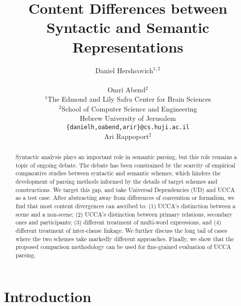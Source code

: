 \documentclass[11pt,a4paper]{article}
\title{Content Differences between Syntactic and Semantic Representations}
\author{Daniel Hershcovich$^{1,2}$ \\
  \\\And
  Omri Abend$^2$ \\
  $^1$The Edmond and Lily Safra Center for Brain Sciences \\
  $^2$School of Computer Science and Engineering \\
  Hebrew University of Jerusalem \\
  \texttt{\{danielh,oabend,arir\}@cs.huji.ac.il}
  \\\And
  Ari Rappoport$^2$
}
\date{}
\newcommand{\oa}[1]{\footnote{\color{red}OA: #1}}
\begin{document}
\maketitle

\begin{abstract}

  Syntactic analysis plays an important role in semantic parsing,
  but this role remains a topic of ongoing debate.
  The debate has been constrained by the scarcity of empirical comparative studies between syntactic and semantic schemes,
  which hinders the development of parsing methods informed by the details of target schemes and constructions.
  We target this gap, and take Universal Dependencies (UD) and UCCA as a test case.
  After abstracting away from differences of convention or formalism,
  we find that most content divergences can ascribed to: 
  (1) UCCA's distinction between a scene and a non-scene; %
  (2) UCCA's distinction between primary relations, secondary ones and participants; %
  (3) different treatment of multi-word expressions, and
  (4) different treatment of inter-clause linkage.
  We further discuss the long tail of cases where the two schemes take markedly
  different approaches.
  Finally, we show that the proposed comparison methodology can be used
  for fine-grained evaluation of UCCA parsing.
\end{abstract}



\section{Introduction}\label{sec:introduction}

  
\end{document}
